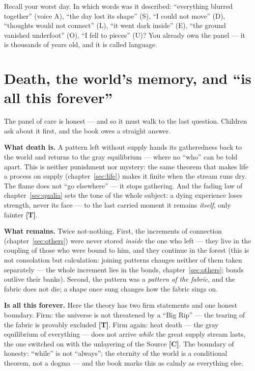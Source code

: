 \documentclass[11pt,letterpaper]{article}
\newcommand{\stT}{\textbf{[T]}\xspace}
\newcommand{\stC}{\textbf{[C]}\xspace}
\begin{document}
\begin{askbox}
Recall your worst day. In which words was it described:
``everything blurred together'' (voice A), ``the day lost its
shape'' (S), ``I could not move'' (D), ``thoughts would not
connect'' (L), ``it went dark inside'' (E), ``the ground vanished
underfoot'' (O), ``I fell to pieces'' (U)? You already own the
panel --- it is thousands of years old, and it is called language.
\end{askbox}

\section{Death, the world's memory, and ``is all this forever''}
\label{sec:death}

The panel of care is honest --- and so it must walk to the last
question. Children ask about it first, and the book owes a straight
answer.

\textbf{What death is.} A pattern left without supply hands its
gatheredness back to the world and returns to the gray equilibrium
--- where no ``who'' can be told apart. This is neither punishment
nor mystery: the same theorem that makes life a process on supply
(chapter~\ref{sec:life}) makes it finite when the stream runs dry.
The flame does not ``go elsewhere'' --- it stops gathering. And the
fading law of chapter~\ref{sec:qualia} sets the tone of the whole
subject: a dying experience loses strength, never its face --- to
the last carried moment it remains \emph{itself}, only fainter
\stT.

\textbf{What remains.} Twice not-nothing. First, the increments of
connection (chapter~\ref{sec:others}) were never stored \emph{inside}
the one who left --- they live in the coupling of those who were
bound to him, and they continue in the forest (this is not
consolation but calculation: joining patterns changes neither of
them taken separately --- the whole increment lies in the bonds,
chapter~\ref{sec:others}; bonds outlive their banks). Second, the pattern
was a \emph{pattern of the fabric}, and the fabric does not die; a
shape once sung changes how the fabric sings on.

\textbf{Is all this forever.} Here the theory has two firm statements
and one honest boundary. Firm: the universe is not threatened by a
``Big Rip'' --- the tearing of the fabric is provably excluded \stT.
Firm again: heat death --- the gray equilibrium of everything ---
does not arrive \emph{while} the great supply stream lasts, the one
switched on with the unlayering of the Source \stC. The boundary of
honesty: ``while'' is not ``always''; the eternity of the world is a
conditional theorem, not a dogma --- and the book marks this as
calmly as everything else.
\end{document}
